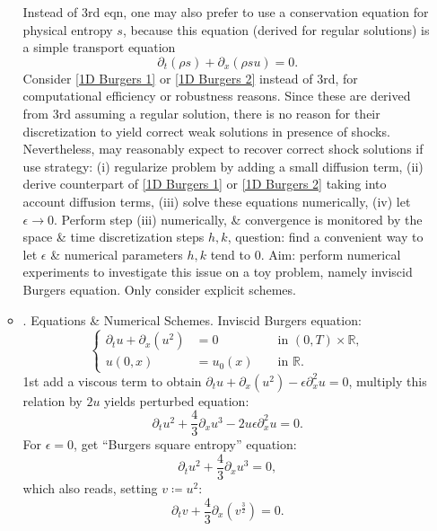 \documentclass{article}
\begin{document}
\begin{enumerate}
\begin{itemize}
		Instead of 3rd eqn, one may also prefer to use a conservation equation for physical entropy $s$, because this equation (derived for regular solutions) is a simple transport equation
		\begin{equation}
			\label{1D Burgers 2}
			\partial_t(\rho s) + \partial_x(\rho su) = 0.
		\end{equation}
		Consider \eqref{1D Burgers 1} or \eqref{1D Burgers 2} instead of 3rd, for computational efficiency or robustness reasons. Since these are derived from 3rd assuming a regular solution, there is no reason for their discretization to yield correct weak solutions in presence of shocks. Nevertheless, may reasonably expect to recover correct shock solutions if use strategy: (i) regularize problem by adding a small diffusion term, (ii) derive counterpart of \eqref{1D Burgers 1} or \eqref{1D Burgers 2} taking into account diffusion terms, (iii) solve these equations numerically, (iv) let $\epsilon\to0$. Perform step (iii) numerically, \& convergence is monitored by the space \& time discretization steps $h,k$, question: find a convenient way to let $\epsilon$ \& numerical parameters $h,k$ tend to 0. Aim: perform numerical experiments to investigate this issue on a toy problem, namely inviscid Burgers equation. Only consider explicit schemes.
		\item {. Equations \& Numerical Schemes.} Inviscid Burgers equation:
		\begin{equation}
			\left\{\begin{split}
				\partial_tu + \partial_x(u^2) &= 0&&\mbox{ in }(0,T)\times\mathbb{R},\\
				u(0,x) &= u_0(x)&&\mbox{ in }\mathbb{R}.
			\end{split}\right.			 
		\end{equation}
		1st add a viscous term to obtain $\partial_tu + \partial_x(u^2) - \epsilon\partial_x^2u = 0$, multiply this relation by $2u$ yields perturbed equation:
		\begin{equation}
			\partial_tu^2 + \frac{4}{3}\partial_xu^3 - 2u\epsilon\partial_x^2u = 0.
		\end{equation}
		For $\epsilon = 0$, get ``Burgers square entropy'' equation:
		\begin{equation}
			\partial_tu^2 + \frac{4}{3}\partial_xu^3 = 0,
		\end{equation}
		which also reads, setting $v\coloneqq u^2$:
		\begin{equation}
			\partial_tv + \frac{4}{3}\partial_x\left(v^{\frac{3}{2}}\right) = 0.
		\end{equation}
		

\end{itemize}
\end{enumerate}
\end{document}
